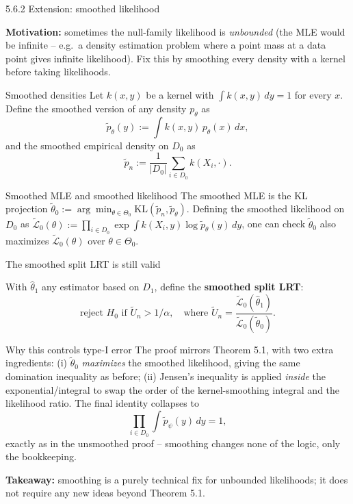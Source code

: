\documentclass[aspectratio=169,10pt]{beamer}
\begin{document}
\begin{frame}[allowframebreaks]{5.6.2 Extension: smoothed likelihood}

  \textbf{Motivation:} sometimes the null-family likelihood is
  \emph{unbounded} (the MLE would be infinite -- e.g.\ a density
  estimation problem where a point mass at a data point gives
  infinite likelihood). Fix this by smoothing every density with a
  kernel before taking likelihoods.

  \begin{block}{Smoothed densities}
    Let $k(x,y)$ be a kernel with $\int k(x,y)\,dy = 1$ for every $x$.
    Define the smoothed version of any density $p_\theta$ as
    $$ \tilde p_\theta(y) := \int k(x,y)\, p_\theta(x)\, dx, $$
    and the smoothed empirical density on $D_0$ as
    $$ \tilde p_n := \frac{1}{|D_0|}\sum_{i\in D_0} k(X_i, \cdot). $$
  \end{block}

  \begin{block}{Smoothed MLE and smoothed likelihood}
    The smoothed MLE is the KL projection
    $\tilde\theta_0 := \arg\min_{\theta\in\Theta_0} \mathrm{KL}(\tilde p_n, \tilde p_\theta)$.
    Defining the smoothed likelihood on $D_0$ as
    $\tilde{\mathcal{L}}_0(\theta) := \prod_{i\in D_0} \exp\!\int k(X_i,y)\log\tilde p_\theta(y)\, dy$,
    one can check $\tilde\theta_0$ also maximizes $\tilde{\mathcal L}_0(\theta)$
    over $\theta \in \Theta_0$.
  \end{block}

\end{frame}

\begin{frame}{The smoothed split LRT is still valid}

  With $\hat\theta_1$ any estimator based on $D_1$, define the
  \textbf{smoothed split LRT}:
  $$ \text{reject } H_0 \text{ if } \tilde U_n > 1/\alpha, \quad \text{where } \tilde U_n = \frac{\tilde{\mathcal{L}}_0(\hat\theta_1)}{\tilde{\mathcal{L}}_0(\tilde\theta_0)}. $$

  \begin{block}{Why this controls type-I error}
    The proof mirrors Theorem 5.1, with two extra ingredients: (i)
    $\tilde\theta_0$ \emph{maximizes} the smoothed likelihood, giving
    the same domination inequality as before; (ii) Jensen's inequality
    is applied \emph{inside} the exponential/integral to swap the order
    of the kernel-smoothing integral and the likelihood ratio. The
    final identity collapses to
    $$ \prod_{i\in D_0}\int \tilde p_\psi(y)\, dy = 1, $$
    exactly as in the unsmoothed proof -- smoothing changes none of the
    logic, only the bookkeeping.
  \end{block}

  \textbf{Takeaway:} smoothing is a purely technical fix for unbounded
  likelihoods; it does not require any new ideas beyond Theorem 5.1.

\end{frame}
\end{document}
